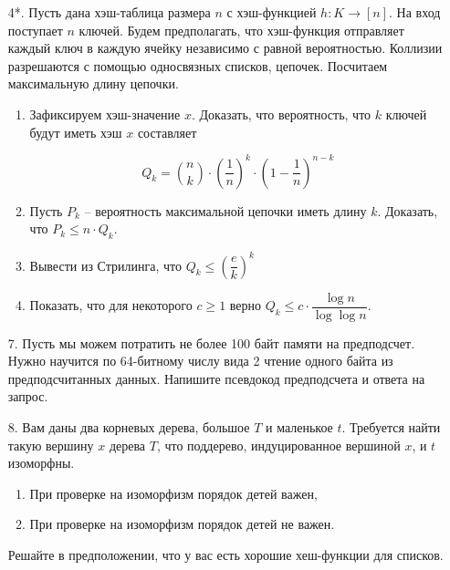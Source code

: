 \begin{enumerate}
	\item[4*.] Пусть дана хэш-таблица размера $n$ с хэш-функцией $h : K \rightarrow [n]$. На вход поступает $n$ 
	ключей. Будем предполагать, что хэш-функция отправляет каждый ключ в каждую ячейку независимо с равной 
	вероятностью. Коллизии разрешаются с помощью односвязных списков, цепочек. Посчитаем максимальную длину 
	цепочки.
	
	\begin{enumerate}
		\item Зафиксируем хэш-значение $x$. Доказать, что вероятность, что $k$ ключей будут иметь хэш $x$ 
		составляет
		
		\begin{equation*}
			Q_k = \binom{n}{k}\cdot \left( \frac{1}{n} \right)^k \cdot \left(1 - \frac{1}{n} \right)^{n-k}
		\end{equation*}
		
		\item Пусть $P_k$ – вероятность максимальной цепочки иметь длину $k$. Доказать, что $P_k \leqslant n 
		\cdot Q_k$.
		
		\item Вывести из Стрилинга, что $Q_k \le \left(\dfrac{e}{k}\right)^k$
		\item Показать, что для некоторого $c \ge 1$ верно $Q_k \leqslant c \cdot \dfrac{\log n}{\log \log n}$.
	\end{enumerate}
	
	\item[7.] Пусть мы можем потратить не более 100 байт памяти на предподсчет. Нужно научится по 64-битному 
	числу вида 2 чтение одного байта из предподсчитанных данных. Напишите псевдокод предподсчета и ответа на 
	запрос.
	
	\item[8.] Вам даны два корневых дерева, большое $T$ и маленькое $t$. Требуется найти такую вершину $x$
	дерева $T$, что поддерево, индуцированное вершиной $x$, и $t$ изоморфны.
	
	\begin{enumerate}
		\item При проверке на изоморфизм порядок детей важен,
		
		\item При проверке на изоморфизм порядок детей не важен.
	\end{enumerate}
	
	Решайте в предположении, что у вас есть хорошие хеш-функции для списков.
	
\end{enumerate}



